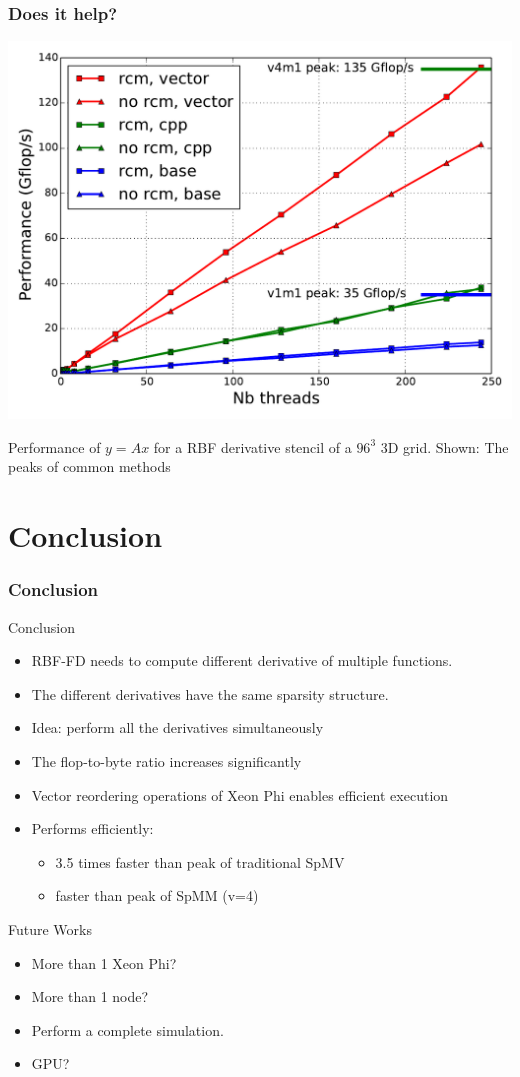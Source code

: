 \documentclass{beamer}
\begin{document}
\begin{frame}
  \frametitle{Does it help?}
  \begin{center}
    \includegraphics[width=.7\linewidth]{slides-figures/ICS-figures/mic_performance_nb_threads.pdf}
  \end{center}
  
  Performance of $y=Ax$ for a RBF derivative stencil of a $96^3$ 3D
  grid. Shown: The peaks of common methods
\end{frame}


\section{Conclusion}

\begin{frame}
  \frametitle{Conclusion}
  
  \begin{block}{Conclusion}
    \begin{itemize}
    \item RBF-FD needs to compute different derivative of multiple functions.
    \item The different derivatives have the same sparsity structure.
    \item Idea: perform all the derivatives simultaneously
    \item The flop-to-byte ratio increases significantly
    \item Vector reordering operations of Xeon Phi enables efficient execution
    \item Performs efficiently: 
      \begin{itemize}
      \item 3.5 times faster than peak of traditional SpMV  
      \item faster than peak of SpMM (v=4)
      \end{itemize}
    \end{itemize}
  \end{block}

  \begin{block}{Future Works}
    \begin{itemize}
    \item More than 1 Xeon Phi?
    \item More than 1 node?
    \item Perform a complete simulation.
    \item GPU?
    \end{itemize}
  \end{block}
\end{frame}



\end{document}
